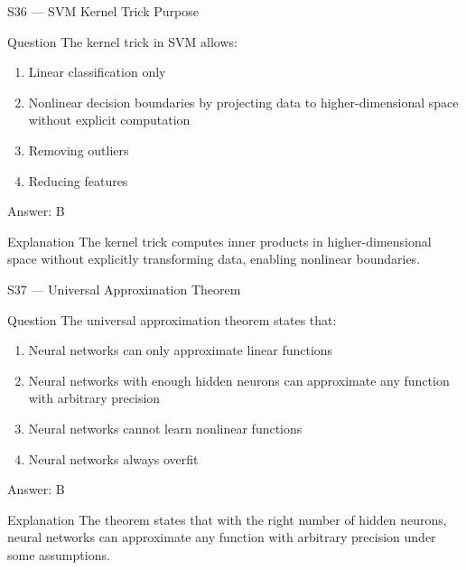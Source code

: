\documentclass[aspectratio=169,8pt]{beamer}
\begin{document}
	\begin{frame}{S36 --- SVM Kernel Trick Purpose}
		\begin{block}{Question}
			The kernel trick in SVM allows:
			\begin{enumerate}
				\item Linear classification only
				\item Nonlinear decision boundaries by projecting data to higher-dimensional space without explicit computation
				\item Removing outliers
				\item Reducing features
			\end{enumerate}
		\end{block}
		\begin{exampleblock}{Answer: B}\end{exampleblock}
		\begin{block}{Explanation}
			The kernel trick computes inner products in higher-dimensional space without explicitly transforming data, enabling nonlinear boundaries.
		\end{block}
	\end{frame}
	
	\begin{frame}{S37 --- Universal Approximation Theorem}
		\begin{block}{Question}
			The universal approximation theorem states that:
			\begin{enumerate}
				\item Neural networks can only approximate linear functions
				\item Neural networks with enough hidden neurons can approximate any function with arbitrary precision
				\item Neural networks cannot learn nonlinear functions
				\item Neural networks always overfit
			\end{enumerate}
		\end{block}
		\begin{exampleblock}{Answer: B}\end{exampleblock}
		\begin{block}{Explanation}
			The theorem states that with the right number of hidden neurons, neural networks can approximate any function with arbitrary precision under some assumptions.
		\end{block}
	\end{frame}
	
\end{document}
